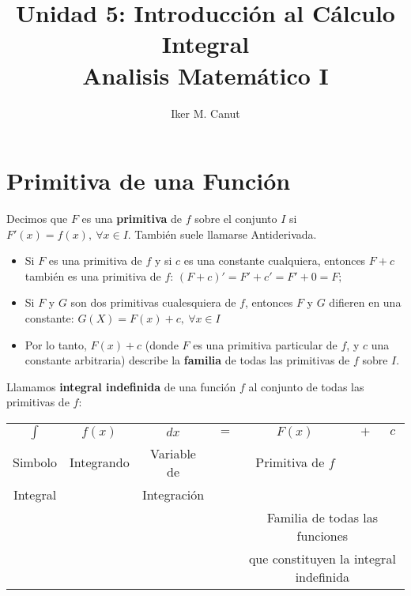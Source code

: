 \documentclass[11pt,a4paper]{article}
\author{Iker M. Canut}
\title{Unidad 5: Introducci\'on al C\'alculo Integral\\ Analisis Matem\'atico I}
\begin{document}
\maketitle
\newpage

\section{Primitiva de una Funci\'on}
Decimos que $F$ es una \textbf{primitiva} de $f$ sobre el conjunto $I$ si $F'(x) = f(x),\ \forall x \in I$. Tambi\'en suele llamarse Antiderivada.

\begin{itemize}
\item Si $F$ es una primitiva de $f$ y si $c$ es una constante cualquiera, entonces $F+c$ tambi\'en es una primitiva de $f$: $(F+c)' = F'+c' = F'+0 = F;$
\item Si $F$ y $G$ son dos primitivas cualesquiera de $f$, entonces $F$ y $G$ difieren en una constante: $G(X)=F(x)+c,\ \forall x \in I$
\item Por lo tanto, $F(x)+c$ (donde $F$ es una primitiva particular de $f$, y $c$ una constante arbitraria) describe la \textbf{familia} de todas las primitivas de $f$ sobre $I$.
\end{itemize}

Llamamos \textbf{integral indefinida} de una funci\'on $f$ al conjunto de todas las primitivas de $f$: 

\begin{table}[h]
\centering
\begin{tabular}{ccccccc}
$\int$ & $f(x)$ & $dx$ & $=$ & $F(x)$ & $+$ & $c$\\
Simbolo & Integrando & Variable de  && Primitiva de $f$ & & \\
Integral & & Integraci\'on & & \multicolumn{3}{|c|}{}\\
\cline{5-7}
& & & & \multicolumn{3}{c}{Familia de todas las funciones}\\
& & & & \multicolumn{3}{c}{que constituyen la integral indefinida}\\
\end{tabular}
\end{table}
\end{document}
